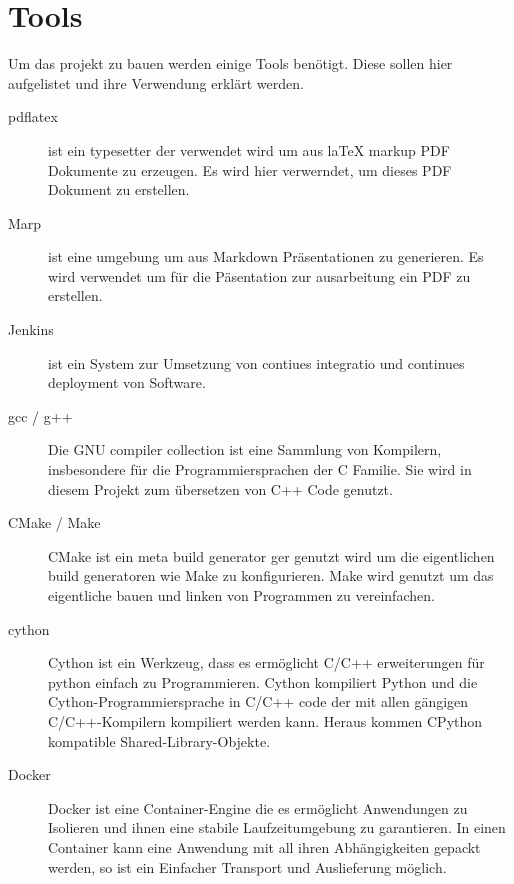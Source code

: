 \chapter*{Tools}
\label{chap:tools}

Um das projekt zu bauen werden einige Tools benötigt. Diese sollen hier aufgelistet und ihre Verwendung erklärt werden.

\begin{description}
    \item[pdflatex] ist ein typesetter der verwendet wird um aus laTeX markup PDF Dokumente zu erzeugen. Es wird hier verwerndet, um dieses PDF Dokument zu erstellen.
    \item[Marp] ist eine  umgebung um aus Markdown Präsentationen zu generieren. Es wird verwendet um für die Päsentation zur ausarbeitung ein PDF zu erstellen.
    \item[Jenkins] ist ein System zur Umsetzung von \glqq contiues integratio \grqq{} und \glqq continues deployment\grqq{} von Software.
    \item[gcc / g++] Die GNU compiler collection ist eine Sammlung von Kompilern, insbesondere für die Programmiersprachen der C Familie. Sie wird in diesem Projekt zum übersetzen von C++ Code genutzt.
    \item[CMake / Make] CMake ist ein meta build generator ger genutzt wird um die eigentlichen build generatoren wie Make zu konfigurieren. Make wird genutzt um das eigentliche bauen und linken von Programmen zu vereinfachen.
    \item[cython] Cython ist ein Werkzeug, dass es ermöglicht C/C++ erweiterungen für python einfach zu Programmieren. Cython kompiliert Python und die Cython-Programmiersprache in C/C++ code der mit allen gängigen C/C++-Kompilern kompiliert werden kann. Heraus kommen CPython kompatible Shared-Library-Objekte.
    \item[Docker] Docker ist eine Container-Engine die es ermöglicht Anwendungen zu Isolieren und ihnen eine stabile Laufzeitumgebung zu garantieren. In einen Container kann eine Anwendung mit all ihren Abhängigkeiten gepackt werden, so ist ein Einfacher Transport und Auslieferung möglich.
\end{description}
